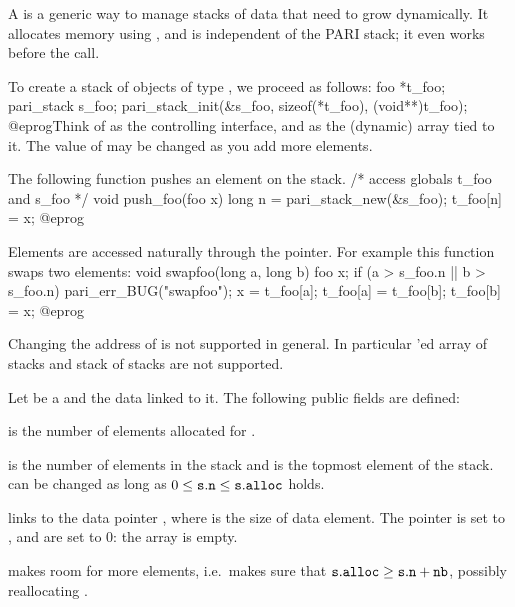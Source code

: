 A  is a generic way to manage stacks of data that need
to grow dynamically. It allocates memory using , and is
independent of the PARI stack; it even works before the  call.


To create a stack of objects of type , we proceed as follows:
\bprog
foo *t_foo;
pari_stack s_foo;
pari_stack_init(&s_foo, sizeof(*t_foo), (void**)t_foo);
@eprog\noindent Think of  as the controlling interface, and
 as the (dynamic) array tied to it. The value of 
may be changed as you add more elements.

The following function pushes an element on the stack.
\bprog
/* access globals t_foo and s_foo */
void push_foo(foo x)
{
  long n = pari_stack_new(&s_foo);
  t_foo[n] = x;
}
@eprog


Elements are accessed naturally through the  pointer.
For example this function swaps two elements:
\bprog
void swapfoo(long a, long b)
{
  foo x;
  if (a > s_foo.n || b > s_foo.n) pari_err_BUG("swapfoo");
  x        = t_foo[a];
  t_foo[a] = t_foo[b];
  t_foo[b] = x;
}
@eprog

Changing the address of  is not supported in general.
In particular 'ed array of stacks and stack of stacks are not
supported.

Let  be a  and  the data linked to it. The
following public fields are defined:

\item {} is the number of elements allocated for .

\item {} is the number of elements in the stack and  is
the topmost element of the stack.   can be changed as long as
$0\leq{\tt s.n}\leq{\tt s.alloc}$ holds.

 links
 to the data pointer , where  is the size of
data element. The pointer  is set to ,  and
 are set to $0$: the array is empty.

 makes room for 
more elements, i.e.~makes sure that ${\tt s.alloc}\geq{\tt s.n} + {\tt nb}$,
possibly reallocating .

